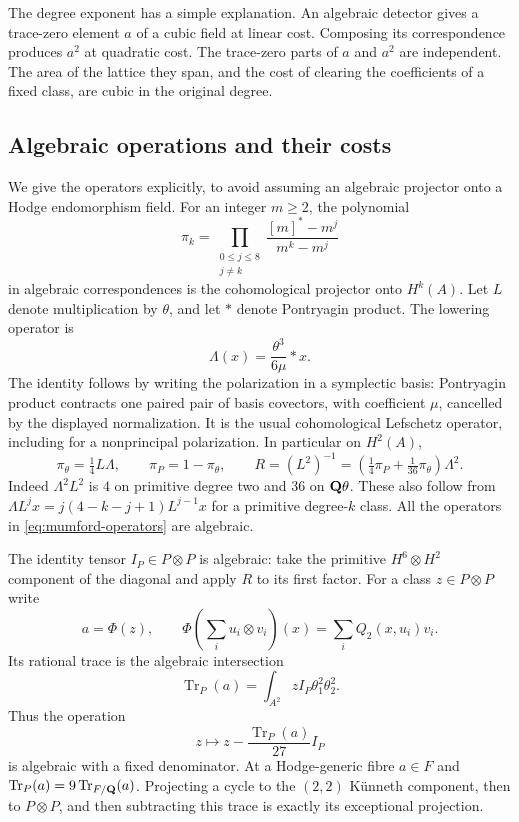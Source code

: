 The degree exponent has a simple explanation. An algebraic detector
gives a trace-zero element $a$ of a cubic field at linear cost.
Composing its correspondence produces $a^2$ at quadratic cost.
The trace-zero parts of $a$ and $a^2$ are independent. The area of the
lattice they span, and the cost of clearing the coefficients of a
fixed class, are cubic in the original degree.

\subsection{Algebraic operations and their costs}

We give the operators explicitly, to avoid assuming an algebraic
projector onto a Hodge endomorphism field.
For an integer $m\geq2$, the polynomial
\[
 \pi_k=
 \prod_{\substack{0\leq j\leq8\\j\ne k}}
 \frac{[m]^*-m^j}{m^k-m^j}
\]
in algebraic correspondences is the cohomological projector onto
$H^k(A)$. Let $L$ denote multiplication by $\theta$, and let $*$ denote
Pontryagin product. The lowering operator is
\[
 \Lambda(x)=\frac{\theta^3}{6\mu}*x.
\]
The identity follows by writing the polarization in a symplectic basis:
Pontryagin product contracts one paired pair of basis covectors, with
coefficient $\mu$, cancelled by the displayed normalization.
It is the usual cohomological Lefschetz operator, including for a
nonprincipal polarization. In particular on $H^2(A)$,
\begin{equation}\label{eq:mumford-operators}
 \pi_\theta=\tfrac14L\Lambda,\qquad
 \pi_P=1-\pi_\theta,\qquad
 R=(L^2)^{-1}
   =\left(\tfrac14\pi_P+\tfrac1{36}\pi_\theta\right)\Lambda^2.
\end{equation}
Indeed $\Lambda^2L^2$ is $4$ on primitive degree two and $36$ on
$\mathbf Q\theta$. These also follow from
$\Lambda L^jx=j(4-k-j+1)L^{j-1}x$ for a primitive degree-$k$ class.
All the operators in \eqref{eq:mumford-operators} are algebraic.

The identity tensor $I_P\in P\otimes P$ is algebraic: take the primitive
$H^6\otimes H^2$ component of the diagonal and apply $R$ to its first
factor. For a class $z\in P\otimes P$ write
\[
 a=\Phi(z),\qquad
 \Phi\left(\sum_i u_i\otimes v_i\right)(x)
   =\sum_i Q_2(x,u_i)v_i.
\]
Its rational trace is the algebraic intersection
\[
 \operatorname{Tr}_{P}(a)
   =\int_{A^2}zI_P\theta_1^2\theta_2^2.
\]
Thus the operation
\begin{equation}\label{eq:mumford-trace}
 z\longmapsto z-\frac{\operatorname{Tr}_{P}(a)}{27}I_P
\end{equation}
is algebraic with a fixed denominator. At a Hodge-generic fibre
$a\in F$ and $\operatorname{Tr}_{P}(a)=9\operatorname{Tr}_{F/\mathbf Q}(a)$.
Projecting a cycle to the $(2,2)$ K\"unneth component, then to
$P\otimes P$, and then subtracting this trace is exactly its
exceptional projection.

